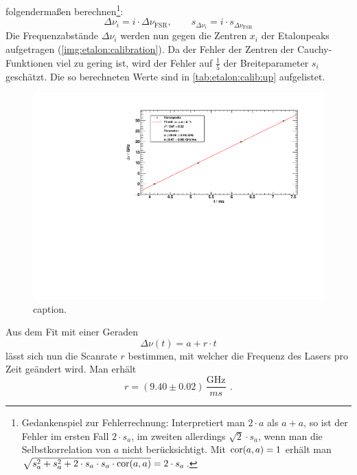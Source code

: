folgendermaßen berechnen\footnote{Gedankenspiel zur Fehlerrechnung: Interpretiert man $2 \cdot a$ als $a + a$, so ist der Fehler im ersten Fall $2 \cdot s_a$, im zweiten
allerdings $\sqrt{2} \cdot s_a$, wenn man die Selbstkorrelation von $a$ nicht berücksichtigt. Mit $\operatorname{cor}(a, a) = 1$
erhält man $\sqrt{s_a^2 + s_a^2 + 2 \cdot s_a \cdot s_a \cdot \operatorname{cor}(a, a)} = 2 \cdot s_a$.}:
\begin{equation}
    \Delta \nu_i = i \cdot \Delta \nu_\text{FSR}, \qquad s_{\Delta \nu_i} = i \cdot s_{\Delta \nu_\text{FSR}}
\end{equation}
Die Frequenzabstände $\Delta \nu_i$ werden nun gegen die Zentren $x_i$  der
Etalonpeaks aufgetragen (\autoref{img:etalon:calibration}). Da der Fehler der Zentren der Cauchy-Funktionen viel zu gering ist, wird der Fehler
auf $\frac{1}{5}$ der Breiteparameter $s_i$ geschätzt. Die so berechneten Werte sind in \autoref{tab:etalon:calib:up} aufgelistet.

\begin{figure}[H]
\begin{center}
    \includegraphics[width=\textwidth]{../img/part2/up-etalon_zoom-etalon_calibration.pdf}
    \caption{caption.}
    \label{img:etalon:calibration}
\end{center}
\end{figure}
Aus dem Fit mit einer Geraden
\begin{equation}
    \Delta \nu(t) = a + r \cdot t  %
\end{equation}
lässt sich nun die Scanrate $r$ bestimmen, mit welcher die Frequenz des Lasers pro Zeit geändert wird. Man erhält
\begin{equation}
    r = (9.40 \pm 0.02)\,\frac{\text{GHz}}{ms}\ \, .
\end{equation}

